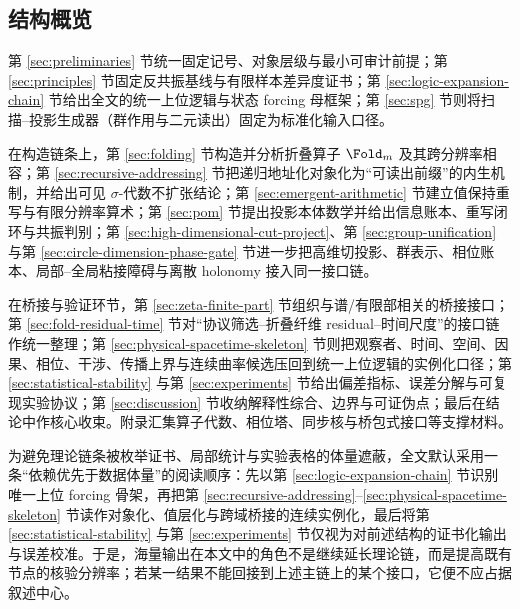 \subsection{结构概览}
第 \ref{sec:preliminaries} 节统一固定记号、对象层级与最小可审计前提；第 \ref{sec:principles} 节固定反共振基线与有限样本差异度证书；第 \ref{sec:logic-expansion-chain} 节给出全文的统一上位逻辑与状态 forcing 母框架；第 \ref{sec:spg} 节则将扫描--投影生成器（群作用与二元读出）固定为标准化输入口径。\par
在构造链条上，第 \ref{sec:folding} 节构造并分析折叠算子 \(\Fold_m\) 及其跨分辨率相容；第 \ref{sec:recursive-addressing} 节把递归地址化对象化为“可读出前缀”的内生机制，并给出可见 \(\sigma\)-代数不扩张结论；第 \ref{sec:emergent-arithmetic} 节建立值保持重写与有限分辨率算术；第 \ref{sec:pom} 节提出投影本体数学并给出信息账本、重写闭环与共振判别；第 \ref{sec:high-dimensional-cut-project}、第 \ref{sec:group-unification} 与第 \ref{sec:circle-dimension-phase-gate} 节进一步把高维切投影、群表示、相位账本、局部--全局粘接障碍与离散 holonomy 接入同一接口链。\par
在桥接与验证环节，第 \ref{sec:zeta-finite-part} 节组织与谱/有限部相关的桥接接口；第 \ref{sec:fold-residual-time} 节对“协议筛选--折叠纤维 residual--时间尺度”的接口链作统一整理；第 \ref{sec:physical-spacetime-skeleton} 节则把观察者、时间、空间、因果、相位、干涉、传播上界与连续曲率候选压回到统一上位逻辑的实例化口径；第 \ref{sec:statistical-stability} 与第 \ref{sec:experiments} 节给出偏差指标、误差分解与可复现实验协议；第 \ref{sec:discussion} 节收纳解释性综合、边界与可证伪点；最后在结论中作核心收束。附录汇集算子代数、相位塔、同步核与桥包式接口等支撑材料。
\par
为避免理论链条被枚举证书、局部统计与实验表格的体量遮蔽，全文默认采用一条“依赖优先于数据体量”的阅读顺序：先以第 \ref{sec:logic-expansion-chain} 节识别唯一上位 forcing 骨架，再把第 \ref{sec:recursive-addressing}--\ref{sec:physical-spacetime-skeleton} 节读作对象化、值层化与跨域桥接的连续实例化，最后将第 \ref{sec:statistical-stability} 与第 \ref{sec:experiments} 节仅视为对前述结构的证书化输出与误差校准。于是，海量输出在本文中的角色不是继续延长理论链，而是提高既有节点的核验分辨率；若某一结果不能回接到上述主链上的某个接口，它便不应占据叙述中心。
\par
